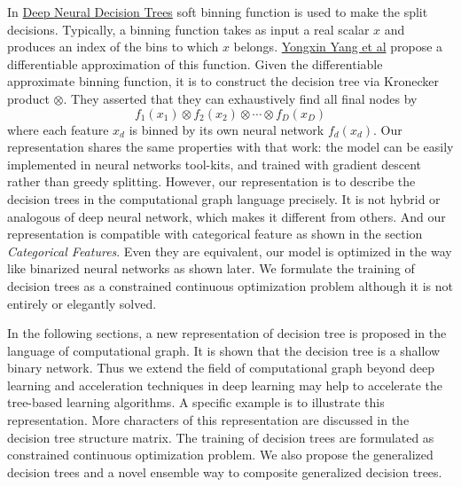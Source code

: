 \documentclass[UTF8]{article}
\begin{document}
In \href{https://arxiv.org/abs/1806.06988}{Deep Neural Decision Trees}\cite{yang2018deep}
soft binning function is used to make the split decisions.
Typically, a binning function takes as input a real scalar $x$
and produces an index of the bins to which $x$ belongs.
\href{https://arxiv.org/abs/1806.06988}{Yongxin Yang et al}\cite{yang2018deep} propose a differentiable approximation of this function.
Given the differentiable approximate binning function,
it is to construct the decision tree via Kronecker product $\otimes$.
They asserted  that they can exhaustively find all final nodes by
$$f_1(x_1)\otimes f_2(x_2)\otimes\cdots\otimes f_D(x_D)$$
where each feature $x_d$ is binned  by its own neural network $f_d(x_d)$.
Our representation shares the same properties with that work:
the model can be easily implemented in neural networks tool-kits,
and trained with gradient descent rather than greedy splitting.
However, our representation is to describe the decision trees in the computational graph language precisely.
It is not hybrid or analogous of deep neural network,
which makes it different from others.
And our representation is  compatible with categorical feature
as shown in the section \emph{Categorical Features}.
Even they are equivalent,
our model is optimized in the way like binarized neural networks as shown later.
We formulate the  training of decision trees
as a constrained continuous optimization problem
although it is not entirely or elegantly solved.

In the following sections, a new representation of decision tree is proposed in the language of computational graph.
It is shown that the decision tree is a shallow binary network.
Thus we extend the field of computational graph beyond deep learning
and acceleration techniques in deep learning may help to accelerate the tree-based learning algorithms.
A specific example is to illustrate this representation.
More characters of  this representation are discussed in the decision tree structure matrix.
The training of decision trees are formulated as constrained continuous optimization problem.
We also propose the generalized decision trees and a novel ensemble way to composite generalized decision trees.
\end{document}
